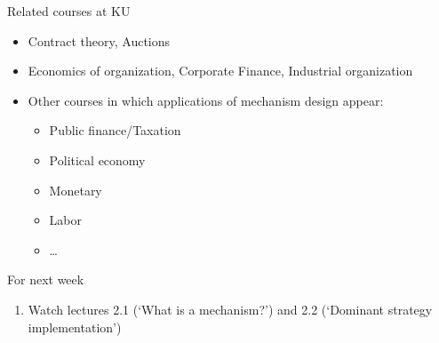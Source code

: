 \documentclass[english,10pt
,aspectratio=169
]{beamer}
\begin{document}
\begin{frame}{Related courses at KU}
\begin{itemize}
	\item Contract theory, Auctions
	\item Economics of organization, Corporate Finance, Industrial organization
	\item Other courses in which applications of mechanism design appear:
	\begin{itemize}
		\item Public finance/Taxation
		\item Political economy
		\item Monetary
		\item Labor
		\item \ldots{}
	\end{itemize}
\end{itemize}
\end{frame}







\begin{frame}{For next week}
	\begin{enumerate}
		\item Watch lectures 2.1 (`What is a mechanism?') and 2.2 (`Dominant strategy implementation')
	\end{enumerate}
\end{frame}
\end{document}

